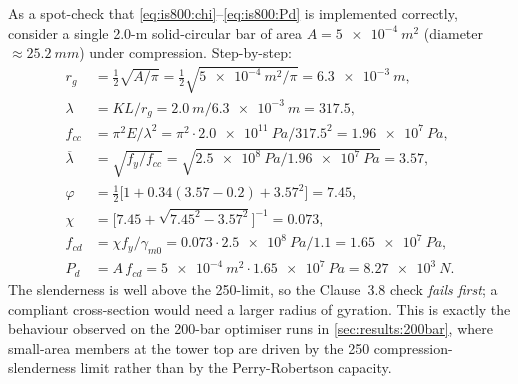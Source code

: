 As a spot-check that \cref{eq:is800:chi}--\cref{eq:is800:Pd} is
implemented correctly, consider a single \num{2.0}-m solid-circular
bar of area $A=\SI{5e-4}{m^2}$ (diameter $\approx\SI{25.2}{mm}$)
under compression. Step-by-step:
\begin{align*}
  r_g &= \tfrac{1}{2}\sqrt{A/\pi}
       = \tfrac{1}{2}\sqrt{\SI{5e-4}{m^2}/\pi}
       = \SI{6.3e-3}{m}, \\
  \lambda &= KL/r_g = \SI{2.0}{m}/\SI{6.3e-3}{m} = \num{317.5}, \\
  f_{cc}  &= \pi^2 E / \lambda^2
          = \pi^2\cdot\SI{2.0e11}{Pa}/\num{317.5}^2
          = \SI{1.96e7}{Pa}, \\
  \overline{\lambda} &= \sqrt{f_y/f_{cc}}
          = \sqrt{\SI{2.5e8}{Pa}/\SI{1.96e7}{Pa}}
          = \num{3.57}, \\
  \varphi &= \tfrac{1}{2}\bigl[1+\num{0.34}(\num{3.57}-\num{0.2})+\num{3.57}^2\bigr]
          = \num{7.45}, \\
  \chi    &= \bigl[\num{7.45}+\sqrt{\num{7.45}^2-\num{3.57}^2}\bigr]^{-1}
          = \num{0.073}, \\
  f_{cd}  &= \chi f_y/\gamma_{m0}
          = \num{0.073}\cdot\SI{2.5e8}{Pa}/\num{1.1}
          = \SI{1.65e7}{Pa}, \\
  P_d     &= A\,f_{cd}
          = \SI{5e-4}{m^2}\cdot\SI{1.65e7}{Pa}
          = \SI{8.27e3}{N}.
\end{align*}
The slenderness is well above the \num{250}-limit, so the
Clause~3.8 check \emph{fails first}; a compliant cross-section
would need a larger radius of gyration. This is exactly the
behaviour observed on the 200-bar optimiser runs in
\cref{sec:results:200bar}, where small-area members at the tower
top are driven by the \num{250} compression-slenderness limit
rather than by the Perry-Robertson capacity.
